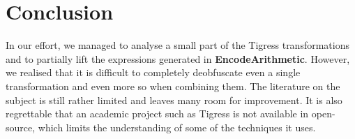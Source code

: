 \documentclass{projectreport}
\begin{document}
\section{Conclusion}

In our effort, we managed to analyse a small part of the Tigress transformations and to partially lift the expressions generated in \textbf{EncodeArithmetic}. However, we realised that it is difficult to completely deobfuscate even a single transformation and even more so when combining them. The literature on the subject is still rather limited and leaves many room for improvement. It is also regrettable that an academic project such as Tigress is not available in open-source, which limits the understanding of some of the techniques it uses.


\nocite{*}



\newpage 
\appendix
\onecolumn
\end{document}
